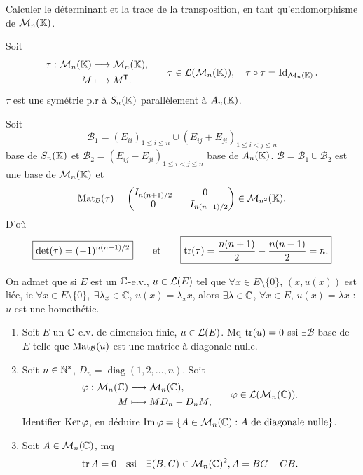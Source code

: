 
\begin{statementbox}
Calculer le déterminant et la trace de la transposition, en tant qu'endomorphisme de
$\mathcal M_n(\mathbb K)$.
\end{statementbox}

\begin{solution}
Soit
\[
\begin{aligned}
\tau:\mathcal M_n(\mathbb K)&\longrightarrow\mathcal M_n(\mathbb K),\\M&\longmapsto M^{\mathsf T}.
\end{aligned}
\qquad
\tau\in\mathcal L(\mathcal M_n(\mathbb K)),\quad\tau\circ\tau=\operatorname{Id}_{\mathcal M_n(\mathbb K)}.
\]
$\tau$ est une symétrie p.r à $S_n(\mathbb K)$ parallèlement à $A_n(\mathbb K)$.

Soit
\[
\mathcal B_1=(E_{ii})_{1\leq i\leq n}\cup(E_{ij}+E_{ji})_{1\leq i<j\leq n}
\]
base de $S_n(\mathbb K)$ et
$\mathcal B_2=(E_{ij}-E_{ji})_{1\leq i<j\leq n}$ base de $A_n(\mathbb K)$.
$\mathcal B=\mathcal B_1\cup\mathcal B_2$ est une base de $\mathcal M_n(\mathbb K)$ et
\[
\operatorname{Mat}_{\mathcal B}(\tau)=
\begin{pmatrix}I_{n(n+1)/2}&0\\0&-I_{n(n-1)/2}\end{pmatrix}\in\mathcal M_{n^2}(\mathbb K).
\]
D'où
\[
\boxed{\det(\tau)=(-1)^{n(n-1)/2}}
\qquad\text{et}\qquad
\boxed{\operatorname{tr}(\tau)=\frac{n(n+1)}2-\frac{n(n-1)}2=n.}
\]
\end{solution}


\begin{statementbox}
On admet que si $E$ est un $\mathbb C$-e.v., $u\in\mathcal L(E)$ tel que
$\forall x\in E\setminus\{0\}$, $(x,u(x))$ est liée,
ie $\forall x\in E\setminus\{0\}$, $\exists\lambda_x\in\mathbb C$, $u(x)=\lambda_xx$, alors
$\exists\lambda\in\mathbb C$, $\forall x\in E$, $u(x)=\lambda x$ : $u$ est une homothétie.

\begin{enumerate}[label=\arabic*)]
  \item Soit $E$ un $\mathbb C$-e.v. de dimension finie, $u\in\mathcal L(E)$. Mq $\operatorname{tr}(u)=0$ ssi
  $\exists\mathcal B$ base de $E$ telle que $\operatorname{Mat}_{\mathcal B}(u)$ est une matrice à
  diagonale nulle.

  \item Soit $n\in\mathbb N^*$, $D_n=\operatorname{diag}(1,2,\ldots,n)$. Soit
  \[
  \begin{aligned}
  \varphi:\mathcal M_n(\mathbb C)&\longrightarrow\mathcal M_n(\mathbb C),\\M&\longmapsto MD_n-D_nM,
  \end{aligned}
  \qquad \varphi\in\mathcal L(\mathcal M_n(\mathbb C)).
  \]
  Identifier $\operatorname{Ker}\varphi$, en déduire
  $\operatorname{Im}\varphi=\{A\in\mathcal M_n(\mathbb C):A\text{ de diagonale nulle}\}$.

  \item Soit $A\in\mathcal M_n(\mathbb C)$, mq
  \[
  \operatorname{tr} A=0\quad\text{ssi}\quad\exists(B,C)\in\mathcal M_n(\mathbb C)^2, A=BC-CB.
  \]
\end{enumerate}
\end{statementbox}

